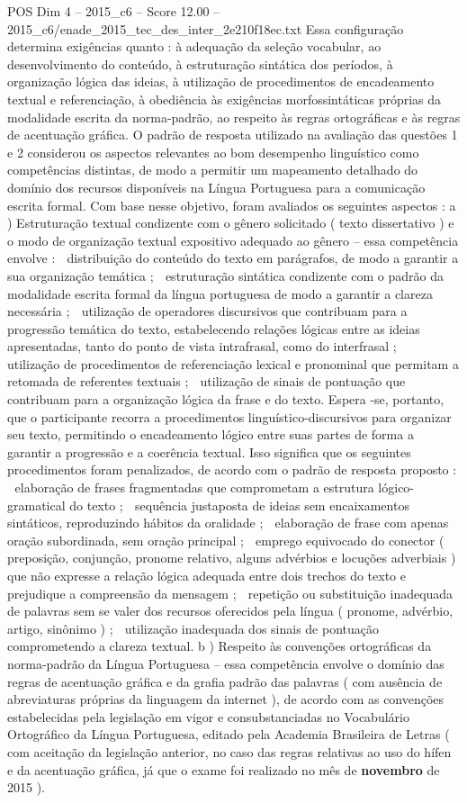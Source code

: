 \begin{textsample}{POS Dim 4 – 2015\_c6 – Score 12.00 – 2015\_c6/enade\_2015\_tec\_des\_inter\_2e210f18ec.txt}
Essa configuração determina exigências quanto : à adequação da seleção vocabular, ao desenvolvimento do conteúdo, à estruturação sintática dos períodos, à organização lógica das ideias, à utilização de procedimentos de encadeamento textual e referenciação, à obediência às exigências morfossintáticas próprias da modalidade escrita da norma-padrão, ao respeito às regras ortográficas e às regras de acentuação gráfica.
O padrão de resposta utilizado na avaliação das questões 1 e 2 considerou os aspectos relevantes ao bom desempenho linguístico como competências distintas, de modo a permitir um mapeamento detalhado do domínio dos recursos disponíveis na Língua Portuguesa para a comunicação escrita formal.
Com base nesse objetivo, foram avaliados os seguintes aspectos : a ) Estruturação textual condizente com o gênero solicitado ( texto dissertativo ) e o modo de organização textual expositivo adequado ao gênero – essa competência envolve :  distribuição do conteúdo do texto em parágrafos, de modo a garantir a sua organização temática ;  estruturação sintática condizente com o padrão da modalidade escrita formal da língua portuguesa de modo a garantir a clareza necessária ;  utilização de operadores discursivos que contribuam para a progressão temática do texto, estabelecendo relações lógicas entre as ideias apresentadas, tanto do ponto de vista intrafrasal, como do interfrasal ;  utilização de procedimentos de referenciação lexical e pronominal que permitam a retomada de referentes textuais ;  utilização de sinais de pontuação que contribuam para a organização lógica da frase e do texto.
Espera -se, portanto, que o participante recorra a procedimentos linguístico-discursivos para organizar seu texto, permitindo o encadeamento lógico entre suas partes de forma a garantir a progressão e a coerência textual.
Isso significa que os seguintes procedimentos foram penalizados, de acordo com o padrão de resposta proposto :  elaboração de frases fragmentadas que comprometam a estrutura lógico-gramatical do texto ;  sequência justaposta de ideias sem encaixamentos sintáticos, reproduzindo hábitos da oralidade ;  elaboração de frase com apenas oração subordinada, sem oração principal ;  emprego equivocado do conector ( preposição, conjunção, pronome relativo, alguns advérbios e locuções adverbiais ) que não expresse a relação lógica adequada entre dois trechos do texto e prejudique a compreensão da mensagem ;  repetição ou substituição inadequada de palavras sem se valer dos recursos oferecidos pela língua ( pronome, advérbio, artigo, sinônimo ) ;  utilização inadequada dos sinais de pontuação comprometendo a clareza textual. b ) Respeito às convenções ortográficas da norma-padrão da Língua Portuguesa – essa competência envolve o domínio das regras de acentuação gráfica e da grafia padrão das palavras ( com ausência de abreviaturas próprias da linguagem da internet ), de acordo com as convenções estabelecidas pela legislação em vigor e consubstanciadas no Vocabulário Ortográfico da Língua Portuguesa, editado pela Academia Brasileira de Letras ( com aceitação da legislação anterior, no caso das regras relativas ao uso do hífen e da acentuação gráfica, já que o exame foi realizado no mês de \textbf{novembro} de 2015 ).

\end{textsample}

